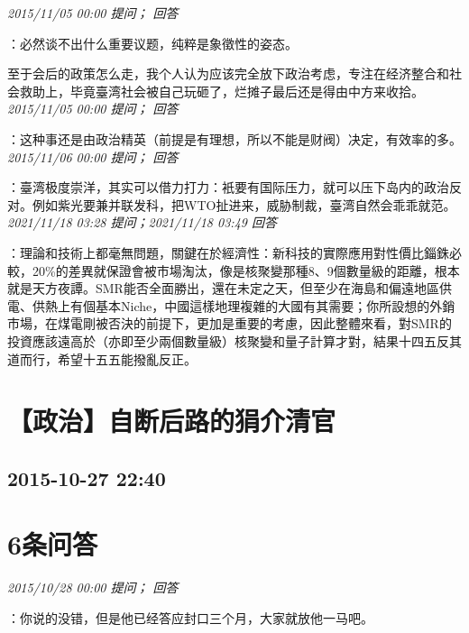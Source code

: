 \documentclass[twocolumn]{ctexart}
\begin{document}
\textit{\hfill\noindent\small 2015/11/05 00:00 提问； 回答}

：必然谈不出什么重要议题，纯粹是象徵性的姿态。

至于会后的政策怎么走，我个人认为应该完全放下政治考虑，专注在经济整合和社会救助上，毕竟臺湾社会被自己玩砸了，烂摊子最后还是得由中方来收拾。\\

\textit{\hfill\noindent\small 2015/11/05 00:00 提问； 回答}

：这种事还是由政治精英（前提是有理想，所以不能是财阀）决定，有效率的多。\\

\textit{\hfill\noindent\small 2015/11/06 00:00 提问； 回答}

：臺湾极度崇洋，其实可以借力打力：衹要有国际压力，就可以压下岛内的政治反对。例如紫光要兼并联发科，把WTO扯进来，威胁制裁，臺湾自然会乖乖就范。\\

\textit{\hfill\noindent\small 2021/11/18 03:28 提问；2021/11/18 03:49 回答}

：理論和技術上都毫無問題，關鍵在於經濟性：新科技的實際應用對性價比錙銖必較，20\%的差異就保證會被市場淘汰，像是核聚變那種8、9個數量級的距離，根本就是天方夜譚。SMR能否全面勝出，還在未定之天，但至少在海島和偏遠地區供電、供熱上有個基本Niche，中國這樣地理複雜的大國有其需要；你所設想的外銷市場，在煤電剛被否決的前提下，更加是重要的考慮，因此整體來看，對SMR的投資應該遠高於（亦即至少兩個數量級）核聚變和量子計算才對，結果十四五反其道而行，希望十五五能撥亂反正。
\\


\section{【政治】自断后路的狷介清官}
\subsection{2015-10-27 22:40}


\section{6条问答}

\textit{\hfill\noindent\small 2015/10/28 00:00 提问； 回答}

：你说的没错，但是他已经答应封口三个月，大家就放他一马吧。\\
\end{document}
